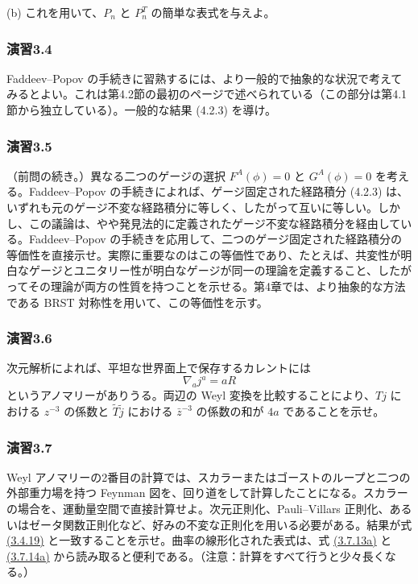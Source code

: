 (b) これを用いて、$P_n$ と $P_n^T$ の簡単な表式を与えよ。

\medskip
\subsubsection*{演習3.4}\label{ex:3.4}
Faddeev--Popov の手続きに習熟するには、より一般的で抽象的な状況で考えてみるとよい。これは第4.2節の最初のページで述べられている（この部分は第4.1節から独立している）。一般的な結果 (4.2.3) を導け。

\medskip
\subsubsection*{演習3.5}\label{ex:3.5}
（前問の続き。）異なる二つのゲージの選択 $F^A(\phi)=0$ と $G^A(\phi)=0$ を考える。Faddeev--Popov の手続きによれば、ゲージ固定された経路積分 (4.2.3) は、いずれも元のゲージ不変な経路積分に等しく、したがって互いに等しい。しかし、この議論は、やや発見法的に定義されたゲージ不変な経路積分を経由している。Faddeev--Popov の手続きを応用して、二つのゲージ固定された経路積分の等価性を直接示せ。実際に重要なのはこの等価性であり、たとえば、共変性が明白なゲージとユニタリー性が明白なゲージが同一の理論を定義すること、したがってその理論が両方の性質を持つことを示せる。第4章では、より抽象的な方法である BRST 対称性を用いて、この等価性を示す。

\medskip
\subsubsection*{演習3.6}\label{ex:3.6}
次元解析によれば、平坦な世界面上で保存するカレントには
\[
\nabla_a j^a=aR
\]
というアノマリーがありうる。両辺の Weyl 変換を比較することにより、$Tj$ における $z^{-3}$ の係数と $\widetilde T\widetilde j$ における $\bar z^{-3}$ の係数の和が $4a$ であることを示せ。

\medskip
\subsubsection*{演習3.7}\label{ex:3.7}
Weyl アノマリーの2番目の計算では、スカラーまたはゴーストのループと二つの外部重力場を持つ Feynman 図を、回り道をして計算したことになる。スカラーの場合を、運動量空間で直接計算せよ。次元正則化、Pauli--Villars 正則化、あるいはゼータ関数正則化など、好みの不変な正則化を用いる必要がある。結果が式 \hyperref[eq:3.4.19]{(3.4.19)} と一致することを示せ。曲率の線形化された表式は、式 \hyperref[eq:3.7.13a]{(3.7.13a)} と \hyperref[eq:3.7.14a]{(3.7.14a)} から読み取ると便利である。（注意：計算をすべて行うと少々長くなる。）

